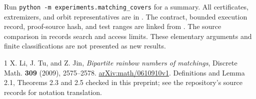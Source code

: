 \documentclass[11pt,letterpaper]{article}
\begin{document}
Run \texttt{python -m experiments.matching\_covers} for a summary. All
certificates, extremizers, and orbit representatives are in
. The contract, bounded execution
record, proof-source hash, and test ranges are linked from
.
The source comparison in  records search
and access limits. These elementary arguments and finite classifications
are not presented as new results.

\begin{thebibliography}{1}
 X. Li, J. Tu, and Z. Jin,
\emph{Bipartite rainbow numbers of matchings}, Discrete Math.
\textbf{309} (2009), 2575--2578.
\href{https://arxiv.org/abs/math/0610910v1}{arXiv:math/0610910v1}.
Definitions and Lemma 2.1, Theorems 2.3 and 2.5 checked in this preprint;
see the repository's source records for notation translation.
\end{thebibliography}
\end{document}
